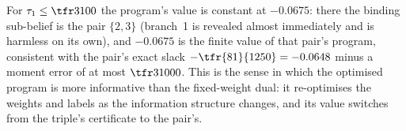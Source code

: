 For $\tau_1\le\tfr3{100}$ the program's value is constant at $-0.0675$: there the binding sub-belief is the pair $\{2,3\}$ (branch~1 is revealed almost immediately and is harmless on its own), and $-0.0675$ is the finite value of that pair's program, consistent with the pair's exact slack $-\tfr{81}{1250}=-0.0648$ minus a moment error of at most $\tfr3{1000}$. This is the sense in which the optimised program is more informative than the fixed-weight dual: it re-optimises the weights and labels as the information structure changes, and its value switches from the triple's certificate to the pair's.
